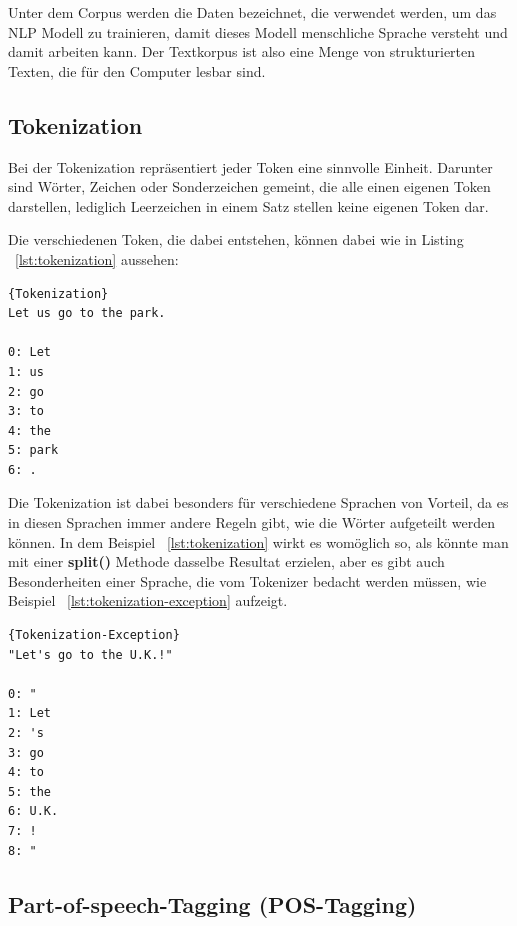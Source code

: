 Unter dem Corpus werden die Daten bezeichnet, die verwendet werden, um das NLP Modell zu trainieren, damit dieses Modell menschliche Sprache versteht und damit arbeiten kann.
Der Textkorpus ist also eine Menge von strukturierten Texten, die für den Computer lesbar sind.\cite{corpus}


\subsection{Tokenization}\label{subsec:tokenization}

Bei der Tokenization repräsentiert jeder Token eine sinnvolle Einheit.
Darunter sind Wörter, Zeichen oder Sonderzeichen gemeint, die alle einen eigenen Token darstellen, lediglich Leerzeichen in einem Satz stellen keine eigenen Token dar.\cite{machineLearningTextAnalysis, naturalLanguageProcessing}

Die verschiedenen Token, die dabei entstehen, können dabei wie in Listing ~\ref{lst:tokenization} aussehen:

\begin{lstlisting}[label={lst:tokenization},caption={Beispiel für die Tokenization}]{Tokenization}
Let us go to the park.

0: Let
1: us
2: go
3: to
4: the
5: park
6: .
\end{lstlisting}

Die Tokenization ist dabei besonders für verschiedene Sprachen von Vorteil, da es in diesen Sprachen immer andere Regeln gibt, wie die Wörter aufgeteilt werden können.
In dem Beispiel ~\ref{lst:tokenization} wirkt es womöglich so, als könnte man mit einer \textbf{split()} Methode dasselbe Resultat erzielen, aber es gibt auch Besonderheiten einer Sprache, die vom Tokenizer bedacht werden müssen, wie Beispiel ~\ref{lst:tokenization-exception} aufzeigt.\cite{machineLearningTextAnalysis, naturalLanguageProcessing}

\begin{lstlisting}[label={lst:tokenization-exception},caption={Ausnahme für bestimmte Tokens}]{Tokenization-Exception}
"Let's go to the U.K.!"

0: "
1: Let
2: 's
3: go
4: to
5: the
6: U.K.
7: !
8: "
\end{lstlisting}

\subsection{Part-of-speech-Tagging (POS-Tagging)}\label{subsec:pos-tagging}

